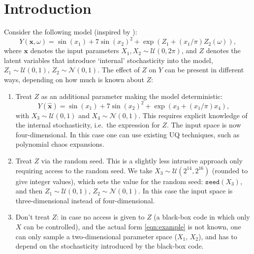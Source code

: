 \documentclass{elsarticle}
\newcommand{\vt}[1]{\bm{#1}}
\begin{document}
\section{Introduction}
Consider the following model (inspired by \cite{Zhu2020a}):
\begin{equation}\label{eqn:example}
Y(\vt{x},\omega) = \sin(x_{1}) + 7 \sin(x_{2})^2 + \exp( Z_{1} + (x_{1}/\pi) Z_{2}(\omega)),
\end{equation}
where $\vt{x}$ denotes the input parameters $X_{1},X_{2} \sim \mathcal{U}(0,2\pi)$, and $Z$ denotes the latent variables that introduce `internal' stochasticity into the model, $Z_{1} \sim \mathcal{U}(0,1)$, $Z_{2} \sim \mathcal{N}(0,1)$.
The effect of $Z$ on $Y$ can be present in different ways, depending on how much is known about $Z$:
\begin{enumerate}
\item Treat $Z$ as an additional parameter making the model deterministic:
\begin{equation}
Y(\hat{\vt{x}}) = \sin(x_{1}) + 7 \sin(x_{2})^2 + \exp( x_{3} + (x_{1}/\pi) x_{4}),
\end{equation}
with $X_{3}\sim \mathcal{U}(0,1)$ and $X_{4}\sim \mathcal{N}(0,1)$. This requires explicit knowledge of the internal stochasticity, i.e.\ the expression for $Z$. The input space is now four-dimensional. In this case one can use existing UQ techniques, such as polynomial chaos expansions.
\item Treat $Z$ via the random seed. This is a slightly less intrusive approach only requiring access to the random seed. We take $X_{3} \sim \mathcal{U}(2^{14}, 2^{16})$ (rounded to give integer values), which sets the value for the random seed: $\texttt{seed}(X_{3})$, and then $Z_{1} \sim \mathcal{U}(0,1)$, $Z_{2} \sim \mathcal{N}(0,1)$. In this case the input space is three-dimensional instead of four-dimensional.
\item Don't treat $Z$: in case no access is given to $Z$ (a black-box code in which only $X$ can be controlled), and the actual form \eqref{eqn:example} is not known, one can only sample a two-dimensional parameter space ($X_{1}$, $X_{2}$), and has to depend on the stochasticity introduced by the black-box code.
\end{enumerate}
\end{document}

